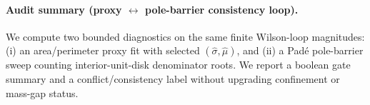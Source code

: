 \paragraph{Audit summary (proxy $\leftrightarrow$ pole-barrier consistency loop).} \AuditTag We compute two bounded diagnostics on the same finite Wilson-loop magnitudes: (i) an area/perimeter proxy fit with selected $(\widehat\sigma,\widehat\mu)$, and (ii) a Pad\'e pole-barrier sweep counting interior-unit-disk denominator roots. We report a boolean gate summary and a conflict/consistency label without upgrading confinement or mass-gap status.